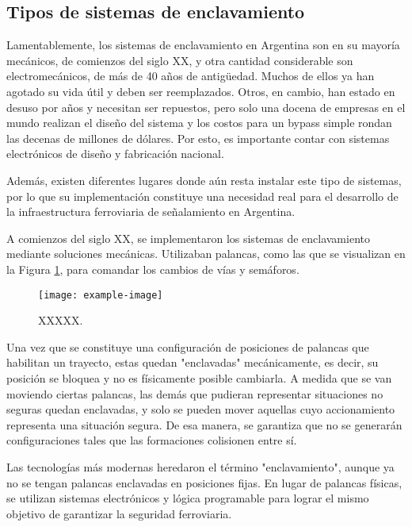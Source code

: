 \subsection{Tipos de sistemas de enclavamiento}

    Lamentablemente, los sistemas de enclavamiento en Argentina son en su mayoría mecánicos, de comienzos del siglo XX, y otra cantidad considerable son electromecánicos, de más de 40 años de antigüedad. Muchos de ellos ya han agotado su vida útil y deben ser reemplazados. Otros, en cambio, han estado en desuso por años y necesitan ser repuestos, pero solo una docena de empresas en el mundo realizan el diseño del sistema y los costos para un bypass simple rondan las decenas de millones de dólares. Por esto, es importante contar con sistemas electrónicos de diseño y fabricación nacional.
    
    Además, existen diferentes lugares donde aún resta instalar este tipo de sistemas, por lo que su implementación constituye una necesidad real para el desarrollo de la infraestructura ferroviaria de señalamiento en Argentina.
    
    A comienzos del siglo XX, se implementaron los sistemas de enclavamiento mediante soluciones mecánicas. Utilizaban palancas, como las que se visualizan en la Figura \ref{fig:enclavamiento_2}, para comandar los cambios de vías y semáforos.
    
        \begin{figure}[h]
            \centering
            \texttt{[image: example-image]}
            \centering\caption{XXXXX.}
            \label{fig:enclavamiento_2}
        \end{figure}
    
    Una vez que se constituye una configuración de posiciones de palancas que habilitan un trayecto, estas quedan "enclavadas" mecánicamente, es decir, su posición se bloquea y no es físicamente posible cambiarla. A medida que se van moviendo ciertas palancas, las demás que pudieran representar situaciones no seguras quedan enclavadas, y solo se pueden mover aquellas cuyo accionamiento representa una situación segura. De esa manera, se garantiza que no se generarán configuraciones tales que las formaciones colisionen entre sí.
    
    Las tecnologías más modernas heredaron el término "enclavamiento", aunque ya no se tengan palancas enclavadas en posiciones fijas. En lugar de palancas físicas, se utilizan sistemas electrónicos y lógica programable para lograr el mismo objetivo de garantizar la seguridad ferroviaria.
    

